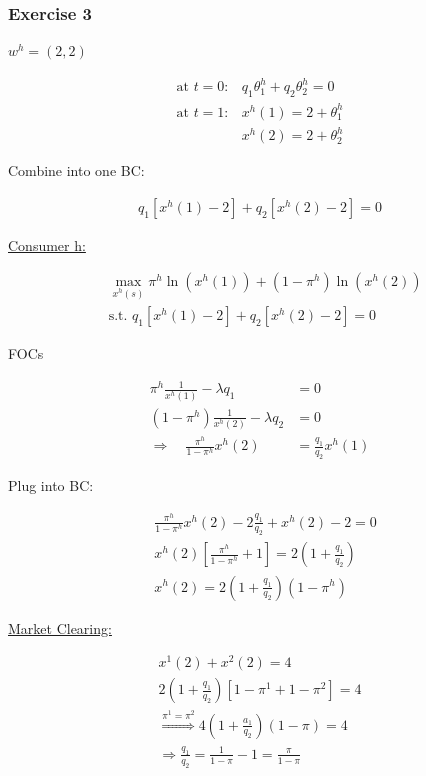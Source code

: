 {
\subsubsection*{Exercise 3}

$w^h=(2,2)$

\begin{enumerate}[label=(\alph*)]
{\item 
\begin{align*}
    \text{at } t = 0: & q_1 \theta_1^h+q_2 \theta_2^h=0 \\
    \text{at } t = 1: & x^h(1)=2+\theta_1^h \\
    & x^h(2)=2+\theta_2^h
\end{align*}

Combine into one BC:

\begin{align*}
    q_1 \left[ x^h(1) -2\right] +q_2\left[x^h(2)-2\right]=0
\end{align*}

\underline{Consumer h:}

\begin{align*}
    & \max _{x^h(s)} \pi^h \ln \left(x^h(1)\right)+\left(1-\pi^h\right) \ln \left(x^h(2)\right) \\
    & \text{s.t. } q_1\left[x^h(1)-2\right]+q_2\left[x^h(2)-2\right]=0
\end{align*}

FOCs

\begin{align*}
    \pi^h \frac{1}{x^h(1)}-\lambda q_1&=0 \\
    (1-\pi^h) \frac{1}{x^h(2)}-\lambda q_2&=0 \\
    \Longrightarrow\quad \frac{\pi^h}{1-\pi^h} x^h(2) &= \frac{q_1}{q_2} x^h(1)
\end{align*}

Plug into BC:

\begin{align*}
    & \frac{\pi^h}{1-\pi^h} x^h(2)-2 \frac{q_1}{q_2}+x^h(2)-2=0 \\
    & x^h(2)\left[\frac{\pi^h}{1-\pi^h}+1\right]=2\left(1+\frac{q_1}{q_2}\right) \\
    & x^h(2)=2\left(1+\frac{q_1}{q_2}\right)\left(1-\pi^h\right)
\end{align*}

\underline{Market Clearing:}

\begin{align*}
    x^1(2)+x^2(2)=4 \\
    2\left(1+\frac{q_1}{q_2}\right)\left[1-\pi^1+1-\pi^2\right]=4 \tag{I} \\
    \stackrel{\pi^1=\pi^2}{\Longrightarrow} 4\left(1+\frac{a_1}{q_2}\right)(1-\pi)=4 \\
    \Longrightarrow \frac{q_1}{q_2}=\frac{1}{1-\pi}-1=\frac{\pi}{1-\pi}
\end{align*}

}
\end{enumerate}}
